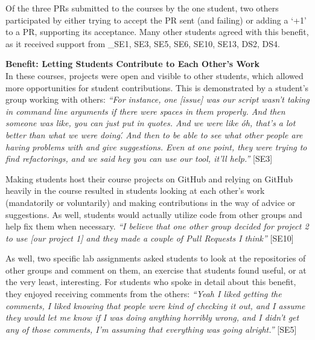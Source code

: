 Of the three PRs submitted to the courses by the one student, two others participated by either trying to accept the PR sent (and failing) or adding a `+1' to a PR, supporting its acceptance. Many other students agreed with this benefit, as it received support from _{SE1, SE3, SE5, SE6, SE10, SE13, DS2, DS4}. %


\textbf{Benefit: Letting Students Contribute to Each Other's Work} \\
In these courses, projects were open and visible to other students, which allowed more opportunities for student contributions. This is demonstrated by a student's group working with others:
\textit{``For instance, one [issue] was our script wasn't taking in command line arguments if there were spaces in them properly. And then someone was like, you can just put in quotes. And we were like \'oh, that's a lot better than what we were doing\'. And then to be able to see what other people are having problems with and give suggestions. Even at one point, they were trying to find refactorings, and we said hey you can use our tool, it'll help.''} [SE3]

Making students host their course projects on GitHub and relying on GitHub heavily in the course resulted in students looking at each other's work (mandatorily or voluntarily) and making contributions in the way of advice or suggestions. As well, students would actually utilize code from other groups and help fix them when necessary. \textit{``I believe that one other group decided for project 2 to use [our project 1] and they made a couple of Pull Requests I think''} [SE10]

As well, two specific lab assignments asked students to look at the repositories of other groups and comment on them, an exercise that students found useful, or at the very least, interesting. For students who spoke in detail about this benefit, they enjoyed receiving comments from the others: \textit{``Yeah I liked getting the comments, I liked knowing that people were kind of checking it out, and I assume they would let me know if I was doing anything horribly wrong, and I didn't get any of those comments, I'm assuming that everything was going alright.''} [SE5]

